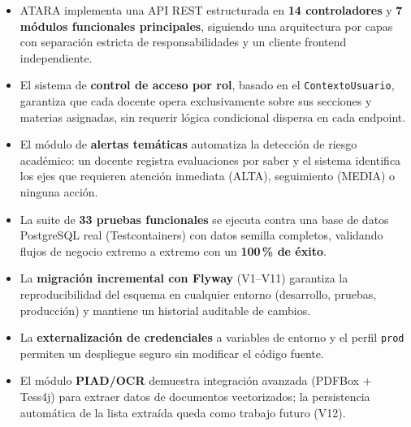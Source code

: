 \documentclass[11pt,a4paper,oneside]{article}
\newcommand{\code}[1]{\texttt{\small #1}}
\begin{document}
\begin{itemize}[leftmargin=*]
  \item ATARA implementa una API REST estructurada en \textbf{14 controladores} y
        \textbf{7 módulos funcionales principales}, siguiendo una arquitectura por capas
        con separación estricta de responsabilidades y un cliente frontend independiente.
  \item El sistema de \textbf{control de acceso por rol}, basado en el \code{ContextoUsuario},
        garantiza que cada docente opera exclusivamente sobre sus secciones y materias
        asignadas, sin requerir lógica condicional dispersa en cada endpoint.
  \item El módulo de \textbf{alertas temáticas} automatiza la detección de riesgo académico:
        un docente registra evaluaciones por saber y el sistema identifica los ejes que
        requieren atención inmediata (ALTA), seguimiento (MEDIA) o ninguna acción.
  \item La suite de \textbf{33 pruebas funcionales} se ejecuta contra una base de datos
        PostgreSQL real (Testcontainers) con datos semilla completos, validando flujos de
        negocio extremo a extremo con un \textbf{100\,\% de éxito}.
  \item La \textbf{migración incremental con Flyway} (V1--V11) garantiza la reproducibilidad
        del esquema en cualquier entorno (desarrollo, pruebas, producción) y mantiene un
        historial auditable de cambios.
  \item La \textbf{externalización de credenciales} a variables de entorno y el perfil
        \code{prod} permiten un despliegue seguro sin modificar el código fuente.
  \item El módulo \textbf{PIAD/OCR} demuestra integración avanzada (PDFBox + Tess4j) para
        extraer datos de documentos vectorizados; la persistencia automática de la lista
        extraída queda como trabajo futuro (V12).
\end{itemize}

\vspace{1em}
\end{document}
